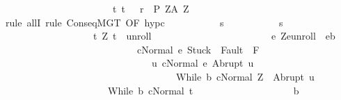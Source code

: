 \begin{isabellebody}
\ \ \ \ \ \ \ \ \ \ \ \ \ \ \ \ \ \ \ \ \ \ \ {\isacharparenleft}{\isacharbraceleft}t{\isachardot}\ {\isacharparenleft}t{\isacharcomma}\ {\isasymsigma}{\isacharparenright}\ {\isasymin}\ {\isacharquery}r{\isacharbraceright}\ {\isasyminter}\ {\isacharquery}P{\isacharprime}\ Z{\isacharparenright}{\isacharcomma}{\isacharparenleft}{\isacharquery}A\ Z{\isacharparenright}{\isachardoublequoteclose}\isanewline
\ \ \ \ \ \ \isamarkupfalse%
\ {\isacharparenleft}rule\ allI{\isacharcomma}\ rule\ ConseqMGT\ {\isacharbrackleft}OF\ hyp{\isacharunderscore}c{\isacharbrackright}{\isacharparenright}\isanewline
\ \ \ \ \ \ \ \ \isamarkupfalse%
\ {\isasymsigma}\ s\isanewline
\ \ \ \ \ \ \ \ \isamarkupfalse%
\ \ {\isachardoublequoteopen}s{\isasymin}\ {\isacharbraceleft}{\isasymsigma}{\isacharbraceright}\ {\isasyminter}\ \ \isanewline
\ \ \ \ \ \ \ \ \ \ \ \ \ \ \ \ \ \ \ {\isacharbraceleft}t{\isachardot}\ {\isacharparenleft}Z{\isacharcomma}\ t{\isacharparenright}\ {\isasymin}\ {\isacharquery}unroll\ {\isasymand}\ \isanewline
\ \ \ \ \ \ \ \ \ \ \ \ \ \ \ \ \ \ \ \ \ \ {\isacharparenleft}{\isasymforall}e{\isachardot}\ {\isacharparenleft}Z{\isacharcomma}e{\isacharparenright}{\isasymin}{\isacharquery}unroll\ {\isasymlongrightarrow}\ e{\isasymin}b\isanewline
\ \ \ \ \ \ \ \ \ \ \ \ \ \ \ \ \ \ \ \ \ \ \ \ \ \ \ {\isasymlongrightarrow}\ {\isasymGamma}{\isasymturnstile}{\isasymlangle}c{\isacharcomma}Normal\ e{\isasymrangle}\ {\isasymRightarrow}{\isasymnotin}{\isacharparenleft}{\isacharbraceleft}Stuck{\isacharbraceright}\ {\isasymunion}\ Fault\ {\isacharbackquote}\ {\isacharparenleft}{\isacharminus}F{\isacharparenright}{\isacharparenright}\ {\isasymand}\ \isanewline
\ \ \ \ \ \ \ \ \ \ \ \ \ \ \ \ \ \ \ \ \ \ \ \ \ \ \ \ \ \ \ {\isacharparenleft}{\isasymforall}u{\isachardot}\ {\isasymGamma}{\isasymturnstile}{\isasymlangle}c{\isacharcomma}Normal\ e{\isasymrangle}\ {\isasymRightarrow}Abrupt\ u\ {\isasymlongrightarrow}\ \isanewline
\ \ \ \ \ \ \ \ \ \ \ \ \ \ \ \ \ \ \ \ \ \ \ \ \ \ \ \ \ \ \ \ \ \ \ \ {\isasymGamma}{\isasymturnstile}{\isasymlangle}While\ b\ c{\isacharcomma}Normal\ Z{\isasymrangle}\ {\isasymRightarrow}\ Abrupt\ u{\isacharparenright}{\isacharparenright}\ {\isasymand}\isanewline
\ \ \ \ \ \ \ \ \ \ \ \ \ \ \ \ \ \ \ \ \ \ {\isasymGamma}{\isasymturnstile}{\isacharparenleft}While\ b\ c{\isacharparenright}{\isasymdown}Normal\ t{\isacharbraceright}\isanewline
\ \ \ \ \ \ \ \ \ \ \ \ \ \ \ \ \ \ \ {\isasyminter}\ b{\isachardoublequoteclose}\isanewline
\ \ \ \ \ \ \ \ \isamarkupfalse%
\ \isamarkupfalse%

\end{isabellebody}
